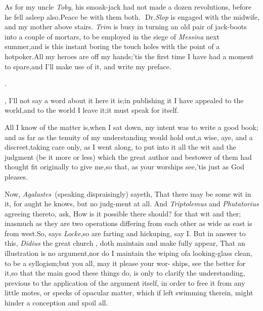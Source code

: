 \documentclass{article}
\begin{document}
As for my uncle \textit{Toby}, his smoak-jack
had not made a dozen revolutions, before
he fell asleep also.\tsh Peace be with
them both.\,\tsk\, Dr.\@ \textit{Slop} is engaged with the
midwife,
and my mother above stairs.\tsk\break
\textit{Trim} is busy in turning an old pair of jack-boots
into a couple of mortars, to be employed in the siege of
\textit{Messina} next summer,\tsk and is this instant boring
the touch holes with the point of a hot\break poker.\tsh All
my heroes are off my hands;\tsh ’tis the first time I have
had a moment to spare,\tsk and I’ll make use of it, and
write my preface.  \vfil {}

\newpage
\null\smallskip
\centerline{}
\bigskip
\centerline{\Large{}.}
\bigskip

, I’ll not say a word about it\tsk\break
here it is;\tsk in publishing it\tsk\break
I have appealed to the world,\tsh and to the world I leave
it;\tsk it must speak for itself.

All I know of the matter is,\tsk when I sat down, my intent was
to write a good book; and as far as the tenuity of my understanding
would hold out,\tsk a wise, aye, and a discreet,\tsk taking care
only, as I went along, to put into it all the wit and the judgment
(be it more or less) which the great author and bestower of them
had thought fit originally to give
me,\tsh so that, as your
worships see,\tsk ’tis just as God pleases.

Now, \textit{Agalastes}\sic\ (speaking dispraising\-ly)
sayeth, That there may be some wit in it, for aught he
knows,\tsk
but no judg-\break ment at all. And \textit{Triptolemus} and \textit{Phutatorius}
agreeing thereto, ask, How is it possible there should?
for that wit and
ther;  inasmuch as they are two operations differing
from each other as wide as east is from west.\tsk So, says
\textit{Locke},\tsk so are farting and hickuping, say I. But
in answer to this, \textit{Didius} the great church \break{}, doth maintain and
make fully appear, That an illustration is no
argument,\tsk nor do I maintain the wiping of\break a
looking-glass clean, to be a syllogism;\break\tsk but you all, may it
please your wor- ships, see the better for it,\tsh so that
the main good these things do, is only to clarify the understanding,
previous to the application of the argument itself, in order to
free it from any little motes, or specks of opacular matter, which
if left swimming therein, might hinder a conception and spoil
all.
\end{document}
